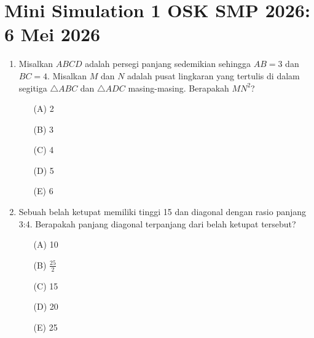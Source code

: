 \documentclass[11pt, a4paper]{scrartcl}
\begin{document}
\section*{Mini Simulation 1 OSK SMP 2026: 6 Mei 2026}

\begin{enumerate}
    \item Misalkan $ABCD$ adalah persegi panjang sedemikian sehingga $AB=3$ dan $BC=4$. Misalkan $M$ dan $N$ adalah pusat lingkaran yang tertulis di dalam segitiga $\triangle ABC$ dan $\triangle ADC$ masing-masing. Berapakah $MN^{2}$?
        \begin{center}
    \end{center}
    \begin{itemize}
        \item[(A)] 2
        \item[(B)] 3
        \item[(C)] 4
        \item[(D)] 5
        \item[(E)] 6
    \end{itemize}

    \item Sebuah belah ketupat memiliki tinggi 15 dan diagonal dengan rasio panjang 3:4. Berapakah panjang diagonal terpanjang dari belah ketupat tersebut?
    \begin{itemize}
        \item[(A)] 10
        \item[(B)] $\frac{25}{2}$
        \item[(C)] 15
        \item[(D)] 20
        \item[(E)] 25
    \end{itemize}


\end{enumerate}
\end{document}
